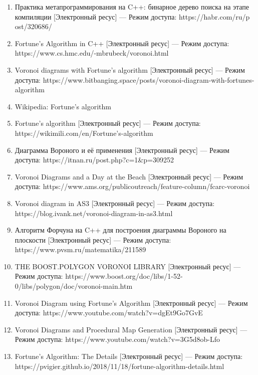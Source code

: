\begin{enumerate}
\item Практика метапрограммирования на C++: бинарное дерево поиска на этапе компиляции [Электронный ресус] — Режим доступа: https://habr.com/ru/p ost/320686/
\item Fortune's Algorithm in C++ [Электронный ресус] — Режим доступа: https://www.cs.hmc.edu/-mbrubeck/voronoi.html
\item Voronoi diagrams with Fortune's algorithm  [Электронный ресус] — Режим доступа: https://www.bitbanging.space/posts/voronoi-diagram-with-fortunes-algorithm
\item Wikipedia: Fortune's algorithm
\item Fortune's algorithm  [Электронный ресус] — Режим доступа: https://wikimili.com/en/Fortune's-algorithm
\item Диаграмма Вороного и её применения [Электронный ресус] — Режим доступа: https://itnan.ru/post.php?c=1&p=309252
\item Voronoi Diagrams and a Day at the Beach [Электронный ресус] — Режим доступа: https://www.ams.org/publicoutreach/feature-column/fcarc-voronoi
\item Voronoi diagram in AS3 [Электронный ресус] — Режим доступа: https://blog.ivank.net/voronoi-diagram-in-as3.html
\item Алгоритм Форчуна на C++ для построения диаграммы Вороного на плоскости [Электронный ресус] — Режим доступа: https://www.pvsm.ru/matematika/211589
\item THE BOOST.POLYGON VORONOI LIBRARY [Электронный ресус] — Режим доступа: https://www.boost.org/doc/libs/1-52-0/libs/polygon/doc/voronoi-main.htm
\item Voronoi Diagram using Fortune's Algorithm [Электронный ресус] — Режим доступа: https://www.youtube.com/watch?v=dgEt9Go7GvE
\item Voronoi Diagrams and Procedural Map Generation [Электронный ресус] — Режим доступа: https://www.youtube.com/watch?v=3G5d8ob-Lfo
\item Fortune's Algorithm: The Details [Электронный ресус] — Режим доступа: https://pvigier.github.io/2018/11/18/fortune-algorithm-details.html
\end{enumerate}


